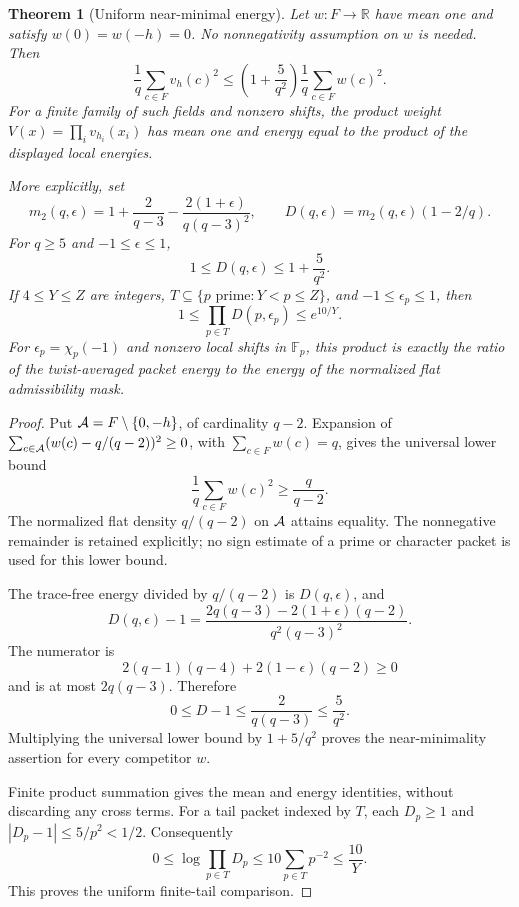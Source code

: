 \documentclass[11pt]{article}
\newtheorem{theorem}{Theorem}[section]
\begin{document}
\begin{theorem}[Uniform near-minimal energy]\label{thm:twistNearMinimal}
Let \(w:F\to\mathbb R\) have mean one and satisfy \(w(0)=w(-h)=0\).
No nonnegativity assumption on \(w\) is needed. Then
\[
 \frac1q\sum_{c\in F}v_h(c)^2
 \leq \left(1+\frac5{q^2}\right)\frac1q\sum_{c\in F}w(c)^2.
\]
For a finite family of such fields and nonzero shifts, the product
weight \(V(x)=\prod_i v_{h_i}(x_i)\) has mean one and energy equal
to the product of the displayed local energies.

More explicitly, set
\[
 m_2(q,\epsilon)=1+\frac{2}{q-3}
       -\frac{2(1+\epsilon)}{q(q-3)^2},\qquad
 D(q,\epsilon)=m_2(q,\epsilon)(1-2/q).
\]
For \(q\geq5\) and \(-1\leq\epsilon\leq1\),
\[
                 1\leq D(q,\epsilon)\leq1+\frac5{q^2}.
\]
If \(4\leq Y\leq Z\) are integers,
\(T\subseteq\{p\text{ prime}:Y<p\leq Z\}\), and
\(-1\leq\epsilon_p\leq1\), then
\[
                    1\leq\prod_{p\in T}D(p,\epsilon_p)
                               \leq e^{10/Y}.
\]
For \(\epsilon_p=\chi_p(-1)\) and nonzero local shifts in
\(\mathbb F_p\), this product is exactly the ratio of the twist-averaged
packet energy to the energy of the normalized flat admissibility mask.
\end{theorem}

\begin{proof}
Put \({\cal A}=F\setminus\{0,-h\}\), of cardinality \(q-2\).
Expansion of
\(\sum_{c\in{\cal A}}(w(c)-q/(q-2))^2\geq0\), with
\(\sum_{c\in F}w(c)=q\), gives the universal lower bound
\[
                       \frac1q\sum_{c\in F}w(c)^2\geq\frac q{q-2}.
\]
The normalized flat density \(q/(q-2)\) on \({\cal A}\) attains equality.
The nonnegative remainder is retained explicitly; no sign estimate of
a prime or character packet is used for this lower bound.

The trace-free energy divided by \(q/(q-2)\) is \(D(q,\epsilon)\), and
\[
 D(q,\epsilon)-1
 =\frac{2q(q-3)-2(1+\epsilon)(q-2)}{q^2(q-3)^2}.
\]
The numerator is
\[
 2(q-1)(q-4)+2(1-\epsilon)(q-2)\geq0
\]
and is at most \(2q(q-3)\). Therefore
\[
 0\leq D-1\leq\frac{2}{q(q-3)}\leq\frac5{q^2}.
\]
Multiplying the universal lower bound by \(1+5/q^2\) proves the
near-minimality assertion for every competitor \(w\).

Finite product summation gives the mean and energy identities, without
discarding any cross terms. For a tail packet indexed by \(T\), each
\(D_p\geq1\) and \(|D_p-1|\leq5/p^2<1/2\).
Consequently
\[
 0\leq\log\prod_{p\in T}D_p
       \leq10\sum_{p\in T}p^{-2}\leq\frac{10}{Y}.
\]
This proves the uniform finite-tail comparison.
\end{proof}
\end{document}
